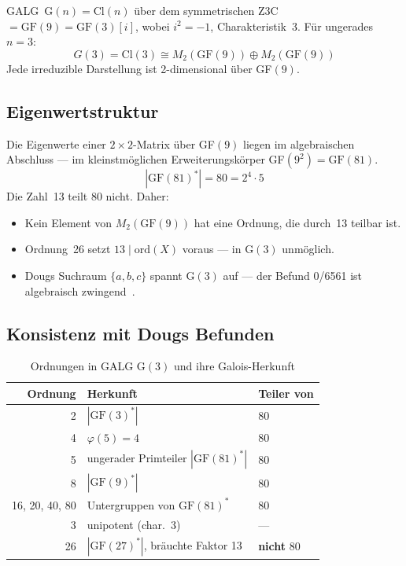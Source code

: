 GALG~G$(n) = \text{Cl}(n)$ über dem symmetrischen Z3C $= \text{GF}(9) = \text{GF}(3)[i]$,
wobei $i^2 = -1$, Charakteristik~3.
Für ungerades $n = 3$:
\begin{equation}
  G(3) = \text{Cl}(3) \cong M_2(\text{GF}(9)) \oplus M_2(\text{GF}(9))
\end{equation}
Jede irreduzible Darstellung ist 2-dimensional über GF$(9)$.

\subsection{Eigenwertstruktur}

Die Eigenwerte einer $2 \times 2$-Matrix über GF$(9)$ liegen im
algebraischen Abschluss --- im kleinstmöglichen Erweiterungskörper
GF$(9^2) = \text{GF}(81)$.
\begin{equation}
  |\text{GF}(81)^*| = 80 = 2^4 \cdot 5
\end{equation}
Die Zahl~13 teilt 80 nicht. Daher:
\begin{itemize}
  \item Kein Element von $M_2(\text{GF}(9))$ hat eine Ordnung, die durch~13 teilbar ist.
  \item Ordnung~26 setzt $13 \mid \text{ord}(X)$ voraus --- in G$(3)$ unmöglich.
  \item Dougs Suchraum $\{a, b, c\}$ spannt G$(3)$ auf --- der Befund 0/6561 ist algebraisch zwingend~\BM.
\end{itemize}

\subsection{Konsistenz mit Dougs Befunden}

\begin{table}[H]
\centering
\caption{Ordnungen in GALG G$(3)$ und ihre Galois-Herkunft}
\begin{tabular}{rll}
\toprule
Ordnung & Herkunft & Teiler von \\
\midrule
2 & $|\text{GF}(3)^*|$ & 80 \\
4 & $\varphi(5) = 4$ & 80 \\
5 & ungerader Primteiler $|\text{GF}(81)^*|$ & 80 \\
8 & $|\text{GF}(9)^*|$ & 80 \\
16, 20, 40, 80 & Untergruppen von $\text{GF}(81)^*$ & 80 \\
3 & unipotent (char.\ 3) & --- \\
26 & $|\text{GF}(27)^*|$, bräuchte Faktor 13 & \textbf{nicht} 80 \\
\bottomrule
\end{tabular}
\end{table}

